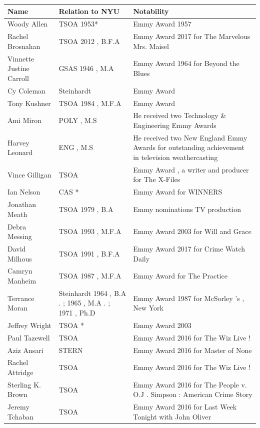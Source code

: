 \documentclass{article}
\begin{document}
\begin{tabular}{lll}
\toprule
Name & Relation to NYU & Notability \\
\midrule
Woody Allen & TSOA 1953* & Emmy Award 1957 \\
Rachel Brosnahan & TSOA 2012 , B.F.A & Emmy Award 2017 for The Marvelous Mrs. Maisel \\
Vinnette Justine Carroll & GSAS 1946 , M.A & Emmy Award 1964 for Beyond the Blues \\
Cy Coleman & Steinhardt & Emmy Award \\
Tony Kushner & TSOA 1984 , M.F.A & Emmy Award \\
Ami Miron & POLY , M.S & He received two Technology \& Engineering Emmy Awards \\
Harvey Leonard & ENG , M.S & He received two New England Emmy Awards for outstanding achievement in television weathercasting \\
Vince Gilligan & TSOA & Emmy Award , a writer and producer for The X-Files \\
Ian Nelson & CAS * & Emmy Award for WINNERS \\
Jonathan Meath & TSOA 1979 , B.A & Emmy nominations TV production \\
Debra Messing & TSOA 1993 , M.F.A & Emmy Award 2003 for Will and Grace \\
David Milhous & TSOA 1991 , B.F.A & Emmy Award 2017 for Crime Watch Daily \\
Camryn Manheim & TSOA 1987 , M.F.A & Emmy Award for The Practice \\
Terrance Moran & Steinhardt 1964 , B.A . ; 1965 , M.A . ; 1971 , Ph.D & Emmy Award 1987 for McSorley 's , New York \\
Jeffrey Wright & TSOA * & Emmy Award 2003 \\
Paul Tazewell & TSOA & Emmy Award 2016 for The Wiz Live ! \\
Aziz Ansari & STERN & Emmy Award 2016 for Master of None \\
Rachel Attridge & TSOA & Emmy Award 2016 for The Wiz Live ! \\
Sterling K. Brown & TSOA & Emmy Award 2016 for The People v. O.J . Simpson : American Crime Story \\
Jeremy Tchaban & TSOA & Emmy Award 2016 for Last Week Tonight with John Oliver \\
\bottomrule
\end{tabular}
\end{document}
